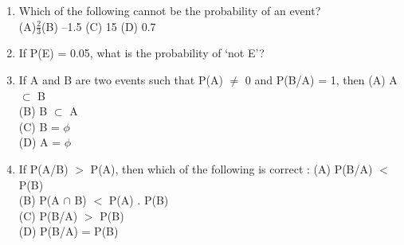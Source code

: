 
\renewcommand{\theequation}{\theenumi}
\begin{enumerate}[label=\thesection.\arabic*.,ref=\thesection.\theenumi]

\item Which of the following cannot be the probability of an event?\\
(A)$\frac{2}{3}$(B) –1.5 (C) 15 (D) 0.7
\item If P(E) = 0.05, what is the probability of ‘not E’?
\item If A and B are two events such that P(A) $\neq$ 0 and P(B/A) = 1, then
(A) A $\subset$ B \\
(B) B $\subset$ A \\
(C) B = $\phi$ \\
(D) A = $\phi$\\

\item If P(A/B) $>$ P(A), then which of the following is correct :
(A) P(B/A) $<$ P(B) \\
(B) P(A $\cap$ B) $<$ P(A) . P(B)\\
(C) P(B/A) $>$ P(B) \\
(D) P(B/A) = P(B)


\end{enumerate}
